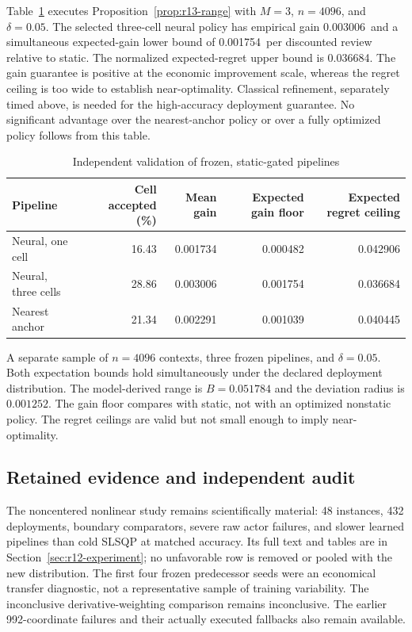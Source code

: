 \documentclass[11pt,letterpaper]{article}
\theoremstyle{definition}
\newcommand{\1}{\mathbf 1}
\newcommand{\RThirteenGainFloor}{0.001754}
\newcommand{\RThirteenGain}{0.003006}
\newcommand{\RThirteenRegret}{0.036684}
\newcommand{\RThirteenRange}{0.051784}
\newcommand{\RThirteenRadius}{0.001252}
\begin{document}
Table~\ref{tab:r13-validation} executes Proposition~\ref{prop:r13-range} with $M=3$, $n=4096$, and $\delta=0.05$. The selected three-cell neural policy has empirical gain \RThirteenGain\ and a simultaneous expected-gain lower bound of \RThirteenGainFloor\ per discounted review relative to static. The normalized expected-regret upper bound is \RThirteenRegret. The gain guarantee is positive at the economic improvement scale, whereas the regret ceiling is too wide to establish near-optimality. Classical refinement, separately timed above, is needed for the high-accuracy deployment guarantee. No significant advantage over the nearest-anchor policy or over a fully optimized policy follows from this table.

\begin{table}[t]
\centering\small
\caption{Independent validation of frozen, static-gated pipelines}\label{tab:r13-validation}
\begin{tabular}{lrrrr}\toprule
Pipeline & Cell accepted (\%) & Mean gain & Expected gain floor & Expected regret ceiling \\\midrule
Neural, one cell & 16.43 & 0.001734 & 0.000482 & 0.042906 \\
Neural, three cells & 28.86 & 0.003006 & 0.001754 & 0.036684 \\
Nearest anchor & 21.34 & 0.002291 & 0.001039 & 0.040445 \\
\bottomrule\end{tabular}
\par\smallskip\begin{minipage}{.96\textwidth}\footnotesize A separate sample of $n=4096$ contexts, three frozen pipelines, and $\delta=0.05$. Both expectation bounds hold simultaneously under the declared deployment distribution. The model-derived range is $B=\RThirteenRange$ and the deviation radius is $\RThirteenRadius$. The gain floor compares with static, not with an optimized nonstatic policy. The regret ceilings are valid but not small enough to imply near-optimality.\end{minipage}
\end{table}


\subsection{Retained evidence and independent audit}
The noncentered nonlinear study remains scientifically material: 48 instances, 432 deployments, boundary comparators, severe raw actor failures, and slower learned pipelines than cold SLSQP at matched accuracy. Its full text and tables are in Section~\ref{sec:r12-experiment}; no unfavorable row is removed or pooled with the new distribution. The first four frozen predecessor seeds were an economical transfer diagnostic, not a representative sample of training variability. The inconclusive derivative-weighting comparison remains inconclusive. The earlier 992-coordinate failures and their actually executed fallbacks also remain available.
\end{document}
